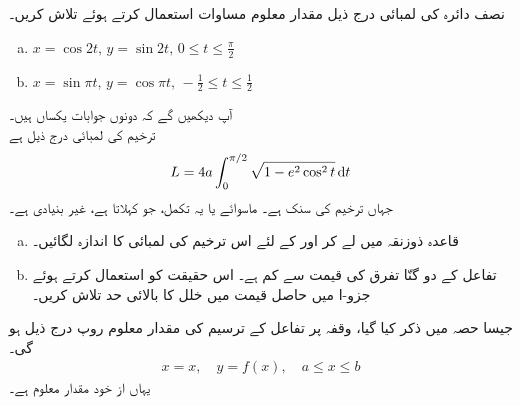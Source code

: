 \\
\\
نصف دائرہ  کی لمبائی درج ذیل مقدار معلوم مساوات استعمال کرتے ہوئے تلاش کریں۔
\begin{enumerate}[a.]
\item
$x=\cos 2t,\, y=\sin 2t,\, 0\le t\le \tfrac{\pi}{2}$
\item
$x=\sin \pi t,\, y=\cos \pi t,\, -\frac{1}{2}\le t\le \frac{1}{2}$
\end{enumerate}
آپ دیکھیں گے کہ دونوں جوابات یکساں ہیں۔
\\
ترخیم  کی لمبائی درج ذیل ہے
\begin{align*}
L=4a\int_0^{\pi/2}\sqrt{1-e^2\cos^2t}\dif t
\end{align*}
جہاں  ترخیم کی سنک ہے۔ ماسوائے  یا  یہ تکمل، جو  کہلاتا ہے، غیر بنیادی ہے۔ 
\begin{enumerate}[a.]
\item
قاعدہ ذوزنقہ میں  لے کر  اور  کے لئے  اس ترخیم کی لمبائی کا اندازہ لگائیں۔
\item
تفاعل  کے دو گنّا تفرق کی قیمت  سے کم ہے۔ اس حقیقت کو استعمال کرتے ہوئے جزو-ا میں حاصل قیمت میں خلل کا بالائی حد تلاش کریں۔
\end{enumerate}
جیسا حصہ  میں ذکر کیا گیا، وقفہ  پر تفاعل  کے ترسیم کی مقدار معلوم روپ درج ذیل ہو گی۔
\begin{align*}
x=x,\quad y=f(x),\quad a\le x\le b
\end{align*} 
یہاں  از خود مقدار معلوم ہے۔

